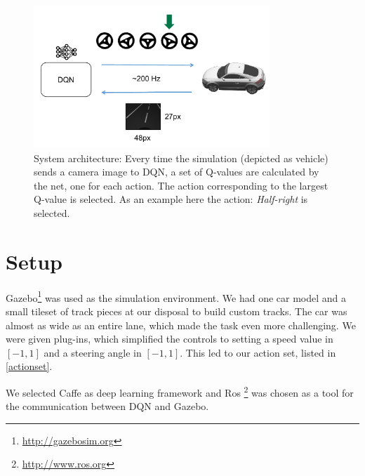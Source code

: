 
\begin{figure}[!t]
	\centering
	\includegraphics[width=3.5in]{../presentation/archi} 
	\vspace{-2.5em}
	\caption{System architecture: Every time the simulation (depicted as vehicle) sends a camera image to DQN, a set of Q-values are calculated by the net, one for each action. The action corresponding to the largest Q-value is selected. As an example here the action: \textit{Half-right} is selected.}
	\label{fig:archi}
\end{figure}

\section{Setup} \label{sec:setup}
Gazebo\footnote{\url{http://gazebosim.org}} was used as the simulation environment. We had one car model and a small tileset of track pieces at our disposal to build custom tracks. The car was almost as wide as an entire lane, which made the task even more challenging. We were given plug-ins, which simplified the controls to setting a speed value in $[-1, 1]$ and a steering angle in $[-1, 1]$. This led to our action set, listed in \ref{actionset}.

We selected Caffe\cite{jia2014caffe} as deep learning framework and Ros \footnote{\url{http://www.ros.org}} was chosen as a tool for the communication between DQN and Gazebo.